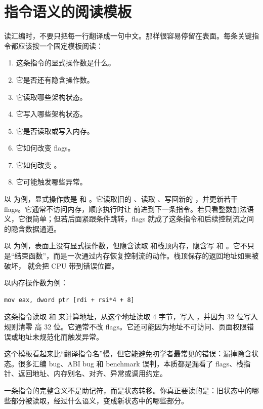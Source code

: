 \section{指令语义的阅读模板}

读汇编时，不要只把每一行翻译成一句中文。那样很容易停留在表面。每条关键指令都应该按一个固定模板阅读：

\begin{enumerate}
  \item 这条指令的显式操作数是什么。
  \item 它是否还有隐含操作数。
  \item 它读取哪些架构状态。
  \item 它写入哪些架构状态。
  \item 它是否读取或写入内存。
  \item 它如何改变 flags。
  \item 它如何改变 。
  \item 它可能触发哪些异常。
\end{enumerate}

以  为例，显式操作数是  和 。它读取旧的 、读取 、写回新的 ，并更新若干 flags。它通常不访问内存，顺序执行时让  前进到下一条指令。若只看整数加法语义，它很简单；但若后面紧跟条件跳转，flags 就成了这条指令和后续控制流之间的隐含数据通道。

以  为例，表面上没有显式操作数，但隐含读取  和栈顶内存，隐含写  和 。它不只是“结束函数”，而是一次通过内存恢复控制流的动作。栈顶保存的返回地址如果被破坏， 就会把 CPU 带到错误位置。

以内存操作数为例：

\begin{lstlisting}
mov eax, dword ptr [rdi + rsi*4 + 8]
\end{lstlisting}

这条指令读取  和  来计算地址，从这个地址读取 4 字节，写入 ，并因为 32 位写入规则清零  高 32 位。它通常不改 flags。它还可能因为地址不可访问、页面权限错误或地址未规范化而触发异常。

这个模板看起来比“翻译指令名”慢，但它能避免初学者最常见的错误：漏掉隐含状态。很多汇编 bug、ABI bug 和 benchmark 误判，本质都是漏看了 flags、栈指针、返回地址、内存别名、对齐、异常或调用约定。

\begin{mentalmodel}
一条指令的完整含义不是助记符，而是状态转移。你真正要读的是：旧状态中的哪些部分被读取，经过什么语义，变成新状态中的哪些部分。
\end{mentalmodel}

